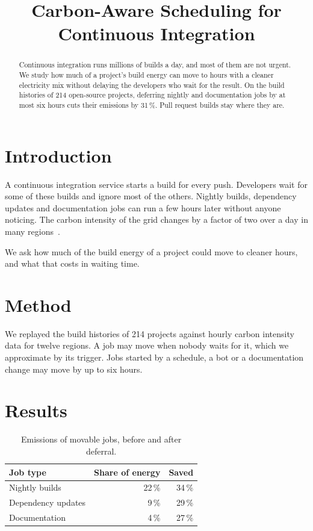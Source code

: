 \documentclass[conference]{IEEEtran}
\begin{document}
\title{Carbon-Aware Scheduling for Continuous Integration}

\author{
}

\maketitle

\begin{abstract}
Continuous integration runs millions of builds a day, and most of them are not
urgent. We study how much of a project's build energy can move to hours with a
cleaner electricity mix without delaying the developers who wait for the
result. On the build histories of 214 open-source projects, deferring nightly
and documentation jobs by at most six hours cuts their emissions by 31\,\%.
Pull request builds stay where they are.
\end{abstract}

\section{Introduction}\label{sec:intro}

A continuous integration service starts a build for every push. Developers
wait for some of these builds and ignore most of the others. Nightly builds,
dependency updates and documentation jobs can run a few hours later without
anyone noticing. The carbon intensity of the grid changes by a factor of two
over a day in many regions~\cite{brandvold2024grid}.

We ask how much of the build energy of a project could move to cleaner hours,
and what that costs in waiting time.

\section{Method}\label{sec:method}

We replayed the build histories of 214 projects against hourly carbon
intensity data for twelve regions. A job may move when nobody waits for it,
which we approximate by its trigger. Jobs started by a schedule, a bot or a
documentation change may move by up to six hours.

\section{Results}\label{sec:results}

\begin{table}[t]
  \caption{Emissions of movable jobs, before and after deferral.}
  \label{tab:results}
  \centering
  \begin{tabular}{lrr}
    \toprule
    Job type & Share of energy & Saved \\
    \midrule
    Nightly builds & 22\,\% & 34\,\% \\
    Dependency updates & 9\,\% & 29\,\% \\
    Documentation & 4\,\% & 27\,\% \\
    \bottomrule
  \end{tabular}
\end{table}
\end{document}
